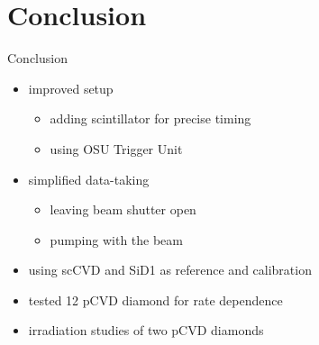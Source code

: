 \section{Conclusion}
\begin{frame}{Conclusion}

	\begin{minipage}[c][6cm]{\textwidth}
		\begin{itemize}\itemfill
			\item improved setup
			\begin{itemize}
				\item adding scintillator for precise timing
				\item using OSU Trigger Unit
			\end{itemize}\vspace*{1pt}
			\item simplified data-taking
			\begin{itemize}
				\item leaving beam shutter open
				\item pumping with the beam
			\end{itemize}\vspace*{1pt}
			\item using scCVD and SiD1 as reference and calibration
			\item tested 12 pCVD diamond for rate dependence
			\item irradiation studies of two pCVD diamonds
		\end{itemize}
	\end{minipage}
	
\end{frame}
